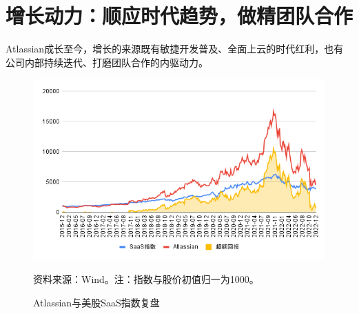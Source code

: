 \section{增长动力：顺应时代趋势，做精团队合作}
Atlassian成长至今，增长的来源既有敏捷开发普及、全面上云的时代红利，也有公司内部持续迭代、打磨团队合作的内驱动力。
\begin{figure}[H]
    \caption{Atlassian与美股SaaS指数复盘}
    \begin{center}
        \includegraphics[width=0.9\linewidth]{img/excessreturn.png}
    \end{center}
    \footnotesize{资料来源：Wind。注：指数与股价初值归一为1000。}
\end{figure}

